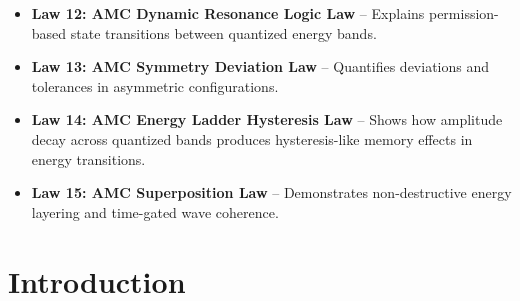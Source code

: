 \documentclass[10pt,aps,pre,onecolumn,superscriptaddress,notitlepage]{revtex4-2}
\begin{document}
\begin{itemize}
\item \textbf{Law 12: AMC Dynamic Resonance Logic Law} – Explains permission-based state transitions between quantized energy bands. \cite{karim2025dynamicresonance}

\item \textbf{Law 13: AMC Symmetry Deviation Law} – Quantifies deviations and tolerances in asymmetric configurations. \cite{karim2025symmetrydeviation}

\item \textbf{Law 14: AMC Energy Ladder Hysteresis Law} – Shows how amplitude decay across quantized bands produces hysteresis-like memory effects in energy transitions. \cite{karim2025energyladder}

\item \textbf{Law 15: AMC Superposition Law} – Demonstrates non-destructive energy layering and time-gated wave coherence. \cite{karim2025superposition}

\end{itemize}

\section{Introduction}
\label{sec:intro}
\end{document}
